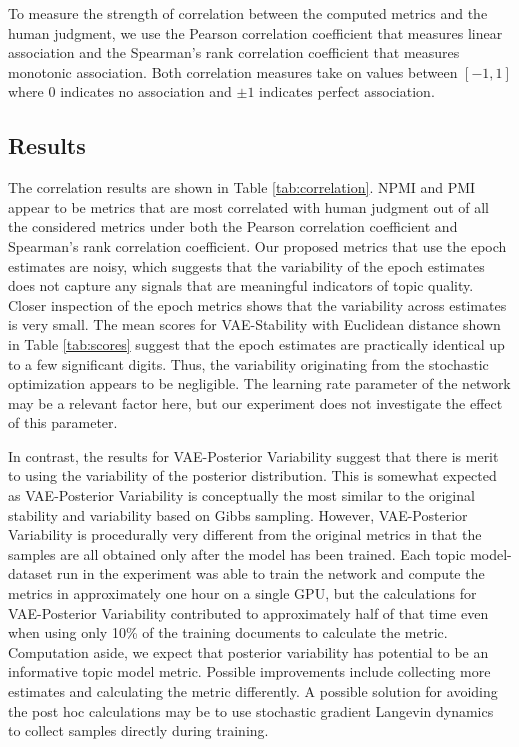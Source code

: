 \documentclass[10pt]{article}
\begin{document}
To measure the strength of correlation between the computed metrics and the human judgment, we use the Pearson correlation coefficient that measures linear association and the Spearman's rank correlation coefficient that measures monotonic association. Both correlation measures take on values between $[-1,1]$ where $0$ indicates no association and $\pm1$ indicates perfect association.

\subsection{Results}\label{sec:results}

The correlation results are shown in Table \ref{tab:correlation}. NPMI and PMI appear to be metrics that are most correlated with human judgment out of all the considered metrics under both the Pearson correlation coefficient and Spearman's rank correlation coefficient. Our proposed metrics that use the epoch estimates are noisy, which suggests that the variability of the epoch estimates does not capture any signals that are meaningful indicators of topic quality. Closer inspection of the epoch metrics shows that the variability across estimates is very small. The mean scores for VAE-Stability with Euclidean distance shown in Table \ref{tab:scores} suggest that the epoch estimates are practically identical up to a few significant digits. Thus, the variability originating from the stochastic optimization appears to be negligible. The learning rate parameter of the network may be a relevant factor here, but our experiment does not investigate the effect of this parameter.

In contrast, the results for VAE-Posterior Variability suggest that there is merit to using the variability of the posterior distribution. This is somewhat expected as VAE-Posterior Variability is conceptually the most similar to the original stability and variability based on Gibbs sampling. However, VAE-Posterior Variability is procedurally very different from the original metrics in that the samples are all obtained only after the model has been trained. Each topic model-dataset run in the experiment was able to train the network and compute the metrics in approximately one hour on a single GPU, but the calculations for VAE-Posterior Variability contributed to approximately half of that time even when using only 10\% of the training documents to calculate the metric. Computation aside, we expect that posterior variability has potential to be an informative topic model metric. Possible improvements include collecting more estimates and calculating the metric differently. A possible solution for avoiding the post hoc calculations may be to use stochastic gradient Langevin dynamics~\cite{Welling:2011} to collect samples directly during training.
\end{document}
